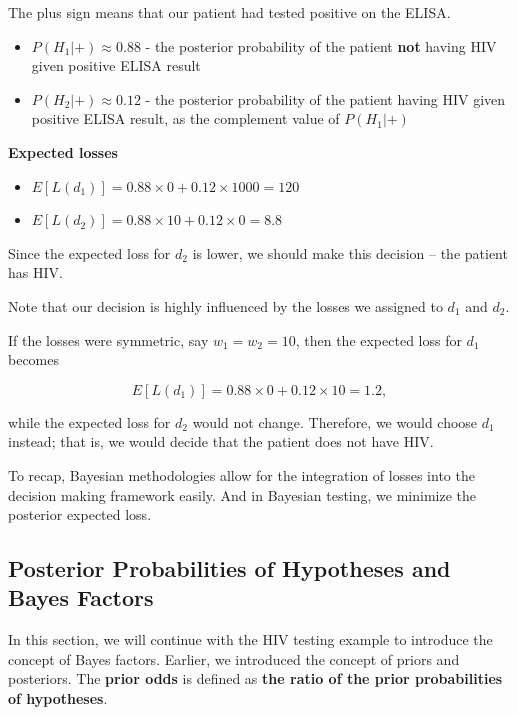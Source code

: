 \documentclass[]{book}
\providecommand{\tightlist}{%
  \setlength{\itemsep}{0pt}\setlength{\parskip}{0pt}}
\theoremstyle{definition}
\theoremstyle{definition}
\theoremstyle{definition}
\theoremstyle{remark}
\begin{document}
The plus sign means that our patient had tested positive on the ELISA.

\begin{itemize}
\tightlist
\item
  \(P(H_1|+) \approx 0.88\) - the posterior probability of the patient
  \textbf{not} having HIV given positive ELISA result
\item
  \(P(H_2|+) \approx 0.12\) - the posterior probability of the patient
  having HIV given positive ELISA result, as the complement value of
  \(P(H_1|+)\)
\end{itemize}

\textbf{Expected losses}

\begin{itemize}
\tightlist
\item
  \(E[L(d_1)] = 0.88 \times 0 + 0.12 \times 1000 = 120\)
\item
  \(E[L(d_2)] = 0.88 \times 10 + 0.12 \times 0 = 8.8\)
\end{itemize}

Since the expected loss for \(d_2\) is lower, we should make this
decision -- the patient has HIV.

Note that our decision is highly influenced by the losses we assigned to
\(d_1\) and \(d_2\).

If the losses were symmetric, say \(w_1 = w_2 = 10\), then the expected
loss for \(d_1\) becomes

\[E[L(d_1)] = 0.88 \times 0 + 0.12 \times 10 = 1.2,\]

while the expected loss for \(d_2\) would not change. Therefore, we
would choose \(d_1\) instead; that is, we would decide that the patient
does not have HIV.

To recap, Bayesian methodologies allow for the integration of losses
into the decision making framework easily. And in Bayesian testing, we
minimize the posterior expected loss.

\subsection{Posterior Probabilities of Hypotheses and Bayes
Factors}\label{posterior-probabilities-of-hypotheses-and-bayes-factors}

In this section, we will continue with the HIV testing example to
introduce the concept of Bayes factors. Earlier, we introduced the
concept of priors and posteriors. The \textbf{prior odds} is defined as
\textbf{the ratio of the prior probabilities of hypotheses}.
\end{document}
